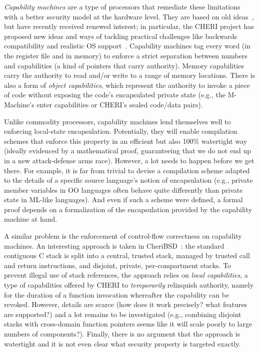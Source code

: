 \documentclass[format=acmsmall, review=false, screen=true]{acmart}
\begin{document}
\emph{Capability machines} are a type of processors that
remediate these limitations with a better security model at
the hardware level. They are based on old ideas~\citep{Carter:1994:HSF:195473.195579,Dennis:1966:PSM:365230.365252,shapiro_eros:_1999},
but have recently received renewed interest; in particular, the CHERI
project has proposed new ideas and ways of tackling practical
challenges like backwards compatibility and realistic OS
support~\citep{Watson2015Cheri,Woodruff:2014:CCM:2665671.2665740}. Capability
machines tag every word (in the register file and in memory) to
enforce a strict separation between numbers and capabilities (a kind
of pointers that carry authority). Memory capabilities carry
the authority to read and/or write to a range of memory
locations. There is also a form of \emph{object capabilities}, which represent the
authority to invoke a piece of code without exposing the code's
encapsulated private state (e.g., the M-Machine's enter capabilities or
CHERI's sealed code/data pairs).

Unlike commodity processors, capability machines lend themselves well to
enforcing local-state encapsulation. Potentially, they will enable compilation
schemes that enforce this property in an efficient but also 100\% watertight way
(ideally evidenced by a mathematical proof, guaranteeing that we do not end up
in a new attack-defense arms race). However, a lot needs to happen before we get
there. For example, it is far from trivial to devise a compilation scheme
adapted to the details of a specific source language's notion of encapsulation
(e.g., private member variables in OO languages often behave quite differently
than private state in ML-like languages). And even if such a scheme were
defined, a formal proof depends on a formalization of the encapsulation provided
by the capability machine at hand.

A similar problem is the enforcement of control-flow correctness on capability
machines. An interesting approach is taken in CheriBSD~\citep{Watson2015Cheri}:
the standard contiguous C stack is split into a central, trusted stack, managed
by trusted call and return instructions, and disjoint, private, per-compartment
stacks. To prevent illegal use of stack references, the approach relies on
\emph{local capabilities}, a type of capabilities offered by CHERI to
\emph{temporarily} relinquish authority, namely for the duration of a function
invocation whereafter the capability can be revoked. However, details are scarce
(how does it work precisely? what features are supported?) and a lot remains to
be investigated (e.g., combining disjoint stacks with cross-domain function
pointers seems like it will scale poorly to large numbers of components?).
Finally, there is no argument that the approach is watertight and it is not even
clear what security property is targeted exactly.
\end{document}
